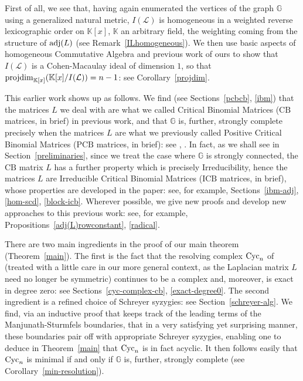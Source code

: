 \documentclass[ALCO]{cedram}
\newcommand{\mbk}{\mbox{$\mathbb{K}$}}
\newcommand{\mbg}{\mbox{$\mathbb{G}$}}
\newcommand{\mcl}{\mbox{$\mathcal{L}$}}
\newcommand{\icb}{\mbox{$\mathrm{ICB}$}}
\newcommand{\pcb}{\mbox{$\mathrm{PCB}$}}
\newcommand{\cb}{\mbox{$\mathrm{CB}$}}
\newcommand{\pd}{\mbox{${\rm projdim}$}}
\newcommand{\adj}{\mbox{${\rm adj}$}}
\newcommand{\cyc}{\mbox{${\rm Cyc}$}}
\begin{document}
First of all, we see that, having again enumerated the vertices of the
graph $\mbg$ using a generalized natural metric, $I(\mcl)$ is
homogeneous in a weighted reverse lexicographic order on $\mbk[x]$,
$\mbk$ an arbitrary field, the weighting coming from the structure of
$\adj(L)$ (see Remark~\ref{ILhomogeneous}). We then use basic aspects
of homogeneous Commutative Algebra and previous work of ours to show
that $I(\mcl)$ is a Cohen-Macaulay ideal of dimension $1$, so that
$\pd_{\mathbb{K}[x]}(\mbk[x]/I(\mcl))=n-1$: see
Corollary~\ref{projdim}.

This earlier work shows up as follows. We find (see
Sections~\ref{pcbcb}, \ref{ibm}) that the matrices $L$ we deal with
are what we called Critical Binomial Matrices ($\cb$ matrices, in
brief) in previous work, and that $\mbg$ is, further, strongly
complete precisely when the matrices $L$ are what we previously called
Positive Critical Binomial Matrices ($\pcb$ matrices, in brief): see
\cite{op}, \cite{opv}. In fact, as we shall see in
Section~\ref{preliminaries}, since we treat the case where $\mbg$ is
strongly connected, the $\cb$ matrix $L$ has a further property which
is precisely Irreducibility, hence the matrices $L$ are Irreducible
Critical Binomial Matrices ($\icb$ matrices, in brief), whose
properties are developed in the paper: see, for example,
Sections~\ref{ibm-adj}, \ref{hom-scd}, \ref{block-icb}. Wherever
possible, we give new proofs and develop new approaches to this
previous work: see, for example, Propositions~\ref{adj(L)rowconstant},
\ref{radical}.

There are two main ingredients in the proof of our main theorem
(Theorem~\ref{main}). The first is the fact that the resolving complex
$\cyc_n$ of \cite{ms} (treated with a little care in our more general
context, as the Laplacian matrix $L$ need no longer be symmetric)
continues to be a complex and, moreover, is exact in degree zero: see
Sections~\ref{cyc-complex-cb}, \ref{exact-degree0}.  The second
ingredient is a refined choice of Schreyer syzygies: see
Section~\ref{schreyer-alg}. We find, via an inductive proof that keeps
track of the leading terms of the Manjunath-Sturmfels boundaries, that
in a very satisfying yet surprising manner, these boundaries pair off
with appropriate Schreyer syzygies, enabling one to deduce in
Theorem~\ref{main} that $\cyc_n$ is in fact acyclic.  It then follows
easily that $\cyc_n$ is minimal if and only if $\mbg$ is, further,
strongly complete (see Corollary~\ref{min-resolution}).
\end{document}
